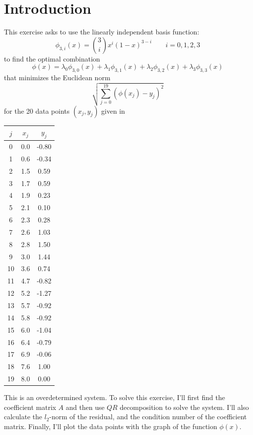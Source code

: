 \documentclass{article}
\begin{document}
\section{Introduction}\label{sec:intro}
This exercise asks to use the linearly independent basis function:
$$\phi_{3,i}(x)=\binom{3}{i}x^{i}(1-x)^{3-i}\quad\quad i = 0, 1, 2, 3$$
to find the optimal combination
$$\phi(x)=\lambda_0\phi_{3,0}(x)+\lambda_1\phi_{3,1}(x)+\lambda_2\phi_{3,2}(x)+\lambda_3\phi_{3,3}(x)$$
that minimizes the Euclidean norm
$$\sqrt{\sum_{j=0}^{19}{(\phi(x_j)-y_j)^2}}$$
for the 20 data points $(x_j,y_j)$ given in

\begin{table}[!ht]
\large        %
\centering    %
\begin{tabular}{|c|c|c|}
\hline
$j$ & $x_j$ & $y_j$ \\     %
\hline
0 & 0.0 & -0.80\\
1 & 0.6 & -0.34\\
2 & 1.5 & 0.59\\
3 & 1.7 & 0.59\\
4 & 1.9 & 0.23\\
5 & 2.1 & 0.10\\
6 & 2.3 & 0.28\\
7 & 2.6 & 1.03\\
8 & 2.8 & 1.50\\
9 & 3.0 & 1.44\\
10 & 3.6 & 0.74\\
11 & 4.7 & -0.82\\
12 & 5.2 & -1.27\\
13 & 5.7 & -0.92\\
14 & 5.8 & -0.92\\
15 & 6.0 & -1.04\\
16 & 6.4 & -0.79\\
17 & 6.9 & -0.06\\
18 & 7.6 & 1.00\\
19 & 8.0 & 0.00\\    
\hline
\end{tabular}
\end{table}

This is an overdetermined system. To solve this exercise, I'll first find the coefficient matrix $A$ and then use $QR$ decomposition to solve the system. I'll also calculate the $l_2$-norm of the residual, and the condition number of the coefficient matrix. Finally, I'll plot the data points with the graph of the function $\phi(x)$.
\end{document}
